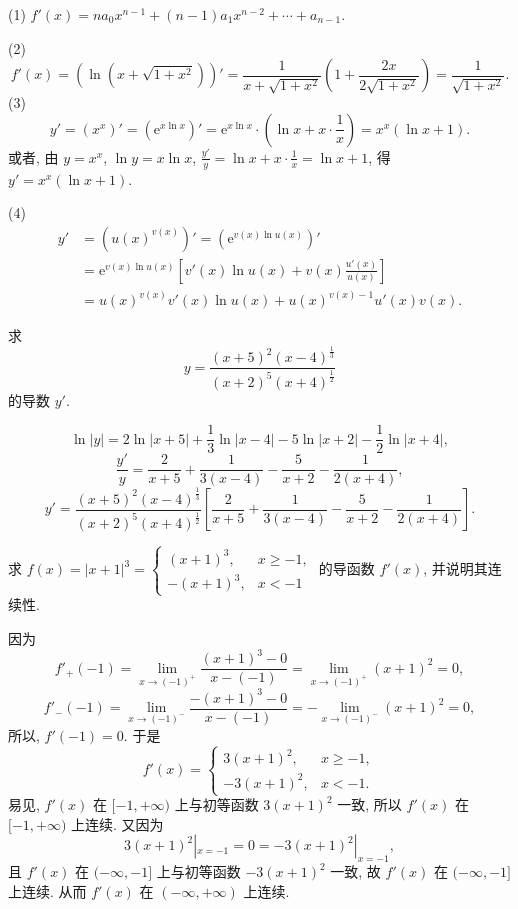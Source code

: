 \begin{solution}
(1) $f'(x) = na_0 x^{n-1} + (n-1)a_1 x^{n-2} + \cdots + a_{n-1}$.

(2)
\[
f'(x) = (\ln(x+\sqrt{1+x^2}))' = \frac{1}{x+\sqrt{1+x^2}}\left(1+\frac{2x}{2\sqrt{1+x^2}}\right) = \frac{1}{\sqrt{1+x^2}}.
\]
(3)
\[
y' = (x^x)' = (\mathrm{e}^{x\ln x})' = \mathrm{e}^{x\ln x}\cdot\left(\ln x + x\cdot\frac{1}{x}\right) = x^x(\ln x + 1).
\]
或者, 由 $y = x^x$, $\ln y = x\ln x$, $\frac{y'}{y} = \ln x + x\cdot\frac{1}{x} = \ln x + 1$, 得 $y' = x^x(\ln x + 1)$.

(4)
\[
\begin{aligned}
y' &= (u(x)^{v(x)})' = (\mathrm{e}^{v(x)\ln u(x)})'\\
&= \mathrm{e}^{v(x)\ln u(x)}\left[v'(x)\ln u(x) + v(x)\frac{u'(x)}{u(x)}\right]\\
&= u(x)^{v(x)}v'(x)\ln u(x) + u(x)^{v(x)-1}u'(x)v(x).
\end{aligned}
\]
\end{solution}

\begin{example}[对数求导法]\label{ex:3.1.7}
求
\[
y = \frac{(x+5)^2(x-4)^{\frac{1}{3}}}{(x+2)^5(x+4)^{\frac{1}{2}}}
\]
的导数 $y'$.
\end{example}

\begin{solution}
\[
\ln|y| = 2\ln|x+5| + \frac{1}{3}\ln|x-4| - 5\ln|x+2| - \frac{1}{2}\ln|x+4|,
\]
\[
\frac{y'}{y} = \frac{2}{x+5} + \frac{1}{3(x-4)} - \frac{5}{x+2} - \frac{1}{2(x+4)},
\]
\[
y' = \frac{(x+5)^2(x-4)^{\frac{1}{3}}}{(x+2)^5(x+4)^{\frac{1}{2}}}\left[\frac{2}{x+5} + \frac{1}{3(x-4)} - \frac{5}{x+2} - \frac{1}{2(x+4)}\right].
\]
\end{solution}

\begin{example}\label{ex:3.1.8}
求 $f(x) = |x+1|^3 = \begin{cases}(x+1)^3, & x \geqslant -1,\\ -(x+1)^3, & x < -1\end{cases}$ 的导函数 $f'(x)$, 并说明其连续性.
\end{example}

\begin{solution}
因为
\[
f'_+(-1) = \lim_{x\to(-1)^+}\frac{(x+1)^3 - 0}{x - (-1)} = \lim_{x\to(-1)^+}(x+1)^2 = 0,
\]
\[
f'_-(-1) = \lim_{x\to(-1)^-}\frac{-(x+1)^3 - 0}{x - (-1)} = -\lim_{x\to(-1)^-}(x+1)^2 = 0,
\]
所以, $f'(-1) = 0$. 于是
\[
f'(x) = \begin{cases}3(x+1)^2, & x \geqslant -1,\\ -3(x+1)^2, & x < -1.\end{cases}
\]
易见, $f'(x)$ 在 $[-1,+\infty)$ 上与初等函数 $3(x+1)^2$ 一致, 所以 $f'(x)$ 在 $[-1,+\infty)$ 上连续. 又因为
\[
3(x+1)^2|_{x=-1} = 0 = -3(x+1)^2|_{x=-1},
\]
且 $f'(x)$ 在 $(-\infty,-1]$ 上与初等函数 $-3(x+1)^2$ 一致, 故 $f'(x)$ 在 $(-\infty,-1]$ 上连续. 从而 $f'(x)$ 在 $(-\infty,+\infty)$ 上连续.
\end{solution}

